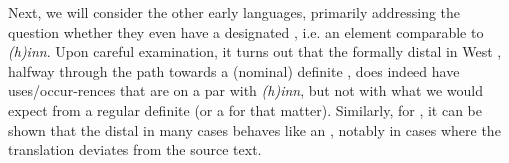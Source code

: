 \documentclass[output=paper,colorlinks,citecolor=brown]{langscibook}
\begin{document}
Next, we will consider the other early  languages, primarily addressing the question whether they even have a designated , i.e. an element comparable to \textit{(h)inn}. Upon careful examination, it turns out that the formally distal  in West , halfway through the  path towards a (nominal) definite , does indeed have uses/occur-rences that are on a par with \textit{(h)inn}, but not with what we would expect from a regular definite  (or a  for that matter). Similarly, for , it can be shown that the distal  in many cases behaves like an , notably in cases where the  translation deviates from the  source text.
\end{document}

